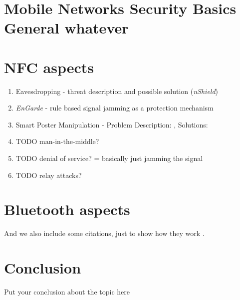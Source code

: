 \documentclass[12pt,a4paper]{article}
\begin{document}
\section{Mobile Networks Security Basics General whatever}

\section{NFC aspects}

\begin{enumerate}
\item Eavesdropping - threat description and possible solution (\emph{nShield}) \cite{DBLP:conf/mobisys/ZhouX14}
\item \emph{EnGarde} - rule based signal jamming as a protection mechanism \cite{DBLP:conf/mobisys/GummesonPGTZ13}
\item Smart Poster Manipulation - Problem Description: \cite{DBLP:conf/IEEEares/Mulliner09}, Solutions: \cite{DBLP:conf/wowmom/WuQKKT12} \cite{DBLP:conf/trustcom/HameedHHK14}
\item TODO man-in-the-middle?
\item TODO denial of service? = basically just jamming the signal
\item TODO relay attacks?
\end{enumerate}

\section{Bluetooth aspects}

And we also include some citations, just to show how they work \cite{Lamport:LaTeX,greenwade93}.

\section{Conclusion}
Put your conclusion about the topic here



{}

\end{document}
